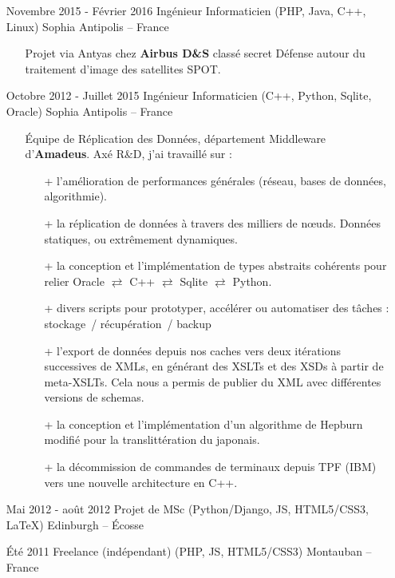 \documentclass{res}
\begin{document}
\begin{resume}
\begin{itemize}
		\item[] Novembre 2015 - F\'evrier 2016 \tabto{5cm} Ing\'enieur Informaticien (PHP, Java, C++, Linux) \hfill Sophia Antipolis -- France
		\begin{itemize}
			\item[] Projet via Antyas chez \textbf{Airbus D\&S} class\'e secret D\'efense autour du traitement d'image des satellites SPOT.
		\end{itemize}
		\item[] Octobre 2012 - Juillet 2015 \tabto{5cm} Ing\'enieur Informaticien (C++, Python, Sqlite, Oracle)  \hfill Sophia Antipolis -- France
		\begin{itemize}
			\item[] \'Equipe de R\'eplication des Donn\'ees, d\'epartement Middleware d'\textbf{Amadeus}. Ax\'e R\&D, j'ai travaill\'e sur :
			\begin{itemize}
				\item[+] l'am\'elioration de performances g\'en\'erales (r\'eseau, bases de donn\'ees, algorithmie).
				\item[+] la r\'eplication de donn\'ees \`a travers des milliers de n\oe{}uds. Donn\'ees statiques, ou extr\^emement dynamiques.
				\item[+] la conception et l'impl\'ementation de types abstraits cohérents pour relier Oracle $\rightleftarrows$ C++ $\rightleftarrows$ Sqlite $\rightleftarrows$ Python.
				\item[+] divers scripts pour prototyper, acc\'el\'erer ou automatiser des t\^aches : stockage~/ r\'ecup\'eration~/ backup\textellipsis
				\item[+] l'export de donn\'ees depuis nos caches vers deux it\'erations successives de XMLs, en g\'en\'erant des XSLTs et des XSDs \`a partir de meta-XSLTs. Cela nous a permis de publier du XML avec diff\'erentes versions de schemas.
				\item[+] la conception et l'impl\'ementation d'un algorithme de Hepburn modifi\'e pour la translitt\'eration du japonais.
				\item[+] la d\'ecommission de commandes de terminaux depuis TPF (IBM) vers une nouvelle architecture en C++.
			\end{itemize}
		\end{itemize}
		\item[] Mai 2012 - ao\^ut 2012 \tabto{5cm} Projet de MSc (Python/Django, JS, HTML5/CSS3, \LaTeX{}) \hfill Edinburgh -- \'Ecosse
		\item[] \'Et\'e 2011 \tabto{5cm} Freelance (ind\'ependant) (PHP, JS, HTML5/CSS3) \hfill Montauban -- France

\end{itemize}
\end{resume}
\end{document}
